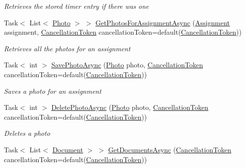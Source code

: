\begin{DoxyCompactItemize}
\begin{DoxyCompactList}\small\item\em Retrieves the stored timer entry if there was one \end{DoxyCompactList}\item 
Task$<$ List$<$ \hyperlink{class_field_service_1_1_data_1_1_photo}{Photo} $>$ $>$ \hyperlink{interface_field_service_1_1_i_assignment_service_a47a12db3d2463b82e94023b53667b6f7}{Get\+Photos\+For\+Assignment\+Async} (\hyperlink{class_field_service_1_1_data_1_1_assignment}{Assignment} assignment, \hyperlink{_view_models_2_assignment_view_model_8cs_aba80ec766846c61f55644fd23860cb18}{Cancellation\+Token} cancellation\+Token=default(\hyperlink{_view_models_2_assignment_view_model_8cs_aba80ec766846c61f55644fd23860cb18}{Cancellation\+Token}))
\begin{DoxyCompactList}\small\item\em Retrieves all the photos for an assignment \end{DoxyCompactList}\item 
Task$<$ int $>$ \hyperlink{interface_field_service_1_1_i_assignment_service_a26a5249b6660cf37841a1c251fdaa86f}{Save\+Photo\+Async} (\hyperlink{class_field_service_1_1_data_1_1_photo}{Photo} photo, \hyperlink{_view_models_2_assignment_view_model_8cs_aba80ec766846c61f55644fd23860cb18}{Cancellation\+Token} cancellation\+Token=default(\hyperlink{_view_models_2_assignment_view_model_8cs_aba80ec766846c61f55644fd23860cb18}{Cancellation\+Token}))
\begin{DoxyCompactList}\small\item\em Saves a photo for an assignment \end{DoxyCompactList}\item 
Task$<$ int $>$ \hyperlink{interface_field_service_1_1_i_assignment_service_a0e60c3d22b9c7ce8109ad0846031107c}{Delete\+Photo\+Async} (\hyperlink{class_field_service_1_1_data_1_1_photo}{Photo} photo, \hyperlink{_view_models_2_assignment_view_model_8cs_aba80ec766846c61f55644fd23860cb18}{Cancellation\+Token} cancellation\+Token=default(\hyperlink{_view_models_2_assignment_view_model_8cs_aba80ec766846c61f55644fd23860cb18}{Cancellation\+Token}))
\begin{DoxyCompactList}\small\item\em Deletes a photo \end{DoxyCompactList}\item 
Task$<$ List$<$ \hyperlink{class_field_service_1_1_data_1_1_document}{Document} $>$ $>$ \hyperlink{interface_field_service_1_1_i_assignment_service_aed0d547a58195aea1407e0bdb79f4078}{Get\+Documents\+Async} (\hyperlink{_view_models_2_assignment_view_model_8cs_aba80ec766846c61f55644fd23860cb18}{Cancellation\+Token} cancellation\+Token=default(\hyperlink{_view_models_2_assignment_view_model_8cs_aba80ec766846c61f55644fd23860cb18}{Cancellation\+Token}))

\end{DoxyCompactItemize}
